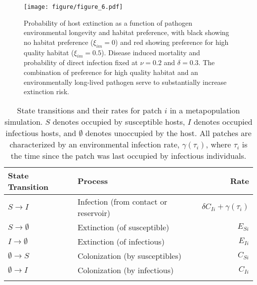 \documentclass{article}
\begin{document}
\begin{figure}
\texttt{[image: figure/figure\_6.pdf]}
\centering
\caption{Probability of host extinction as a function of pathogen environmental longevity and habitat preference, with black showing no habitat preference ($\xi_{im} = 0$) and red showing preference for high quality habitat ($\xi_{im} = 0.5$).  Disease induced mortality and probability of direct infection fixed at $\nu = 0.2$ and $\delta = 0.3$.  The combination of preference for high quality habitat and an environmentally long-lived pathogen serve to substantially increase extinction risk.}
\label{pext}
\end{figure}
\clearpage

\begin{table}
\caption{State transitions and their rates for patch $i$ in a metapopulation simulation.  $S$ denotes occupied by  susceptible hosts, $I$ denotes occupied infectious hosts, and $\emptyset$ denotes unoccupied by the host.  All patches are characterized by an environmental infection rate, $\gamma(\tau_i)$, where $\tau_i$ is the time since the patch was last occupied by infectious individuals.}
\begin{tabular}{llr}
State Transition & Process &  Rate \\
\hline
$S \rightarrow I$ & Infection (from contact or reservoir) & $\delta C_{Ii} + \gamma(\tau_i)$\\
$S \rightarrow \emptyset $ & Extinction (of susceptible) & $E_{Si}$\\
$I \rightarrow \emptyset $ & Extinction (of infectious) &  $E_{Ii}$ \\
$\emptyset \rightarrow S$ & Colonization (by susceptibles) & $C_{Si}$\\
$\emptyset \rightarrow I$ & Colonization (by infectious) & $C_{Ii}$\\
\label{transitions}
\end{tabular}
\end{table}
\end{document}
